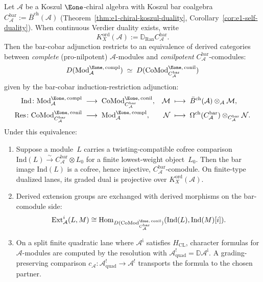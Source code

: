 \begin{theorem}
\label{thm:e1-module-koszul-duality}
Let $\mathcal{A}$ be a Koszul $\Eone$-chiral algebra with Koszul
bar coalgebra
$C_{\mathcal{A}}^{\mathrm{bar}} := \bar{B}^{\mathrm{ch}}(\mathcal{A})$
\textup{(}Theorem~\ref{thm:e1-chiral-koszul-duality},
Corollary~\ref{cor:e1-self-duality}\textup{)}. When continuous
Verdier duality exists, write
\[
K_X^{\mathrm{ord}}(\mathcal A)
:=\mathbb D_{\operatorname{Ran}}C_{\mathcal A}^{\mathrm{bar}}.
\]
Then the bar-cobar adjunction
restricts to an equivalence of derived categories between
\emph{complete} (pro-nilpotent) $\mathcal{A}$-modules and
\emph{conilpotent} $C_{\mathcal{A}}^{\mathrm{bar}}$-comodules:
\[
D(\mathrm{Mod}^{\Eone,\,\mathrm{compl}}_{\mathcal{A}})
\;\simeq\;
D(\mathrm{CoMod}^{\Eone,\,\mathrm{conil}}_{C_{\mathcal{A}}^{\mathrm{bar}}})
\]
given by the bar-cobar induction-restriction adjunction:
\begin{align*}
\mathrm{Ind}\colon \mathrm{Mod}^{\Eone,\,\mathrm{compl}}_{\mathcal{A}}
&\;\longrightarrow\;
\mathrm{CoMod}^{\Eone,\,\mathrm{conil}}_{C_{\mathcal{A}}^{\mathrm{bar}}}, &
\mathcal{M} &\;\longmapsto\;
\bar{B}^{\mathrm{ch}}(\mathcal{A}) \otimes_{\mathcal{A}} \mathcal{M},
\\
\mathrm{Res}\colon \mathrm{CoMod}^{\Eone,\,\mathrm{conil}}_{C_{\mathcal{A}}^{\mathrm{bar}}}
&\;\longrightarrow\;
\mathrm{Mod}^{\Eone,\,\mathrm{compl}}_{\mathcal{A}}, &
\mathcal{N} &\;\longmapsto\;
\Omega^{\mathrm{ch}}(C_{\mathcal{A}}^{\mathrm{bar}})
\otimes_{C_{\mathcal{A}}^{\mathrm{bar}}}
\mathcal{N}.
\end{align*}
Under this equivalence:
\begin{enumerate}[label=\textup{(\roman*)}]
\item Suppose a module~$L$ carries a twisting-compatible cofree
 comparison
 $\mathrm{Ind}(L)\xrightarrow{\sim}
 C_{\mathcal A}^{\mathrm{bar}}\otimes L_0$ for a finite lowest-weight
 object~$L_0$.  Then the bar image
 $\mathrm{Ind}(L)$ is a cofree, hence injective,
 $C_{\mathcal{A}}^{\mathrm{bar}}$-comodule. On finite-type dualized
 lanes, its graded dual is projective over
 $K_X^{\mathrm{ord}}(\mathcal A)$.
\item Derived extension groups are exchanged with derived morphisms on
 the bar-comodule side:
 \[
 \mathrm{Ext}^i_{\mathcal{A}}(L, M) \cong
 \operatorname{Hom}_{D(\mathrm{CoMod}^{\Eone,\,\mathrm{conil}}_{C_{\mathcal{A}}^{\mathrm{bar}}})}
 (\mathrm{Ind}(L), \mathrm{Ind}(M)[i]).
 \]
\item On a split finite quadratic lane where
$\mathcal A^{\mathrm i}$ satisfies $H_{\mathrm{CL}}$, character
formulas for $\mathcal A$-modules are computed by the resolution with
$\mathcal A^!_{\mathrm{quad}}=\mathbb D\mathcal A^{\mathrm i}$.
A grading-preserving comparison
$c_\mathcal A\colon\mathcal A^!_{\mathrm{quad}}\to\mathcal A^!$
transports the formula to the chosen partner.
\end{enumerate}
\end{theorem}

